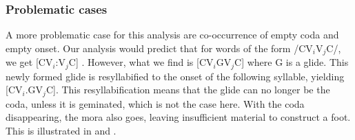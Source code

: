 
\subsubsection{Problematic cases}\label{sec:phon:Problematiccases}


A more problematic case for this analysis are co-occurrence of empty coda and empty onset. Our analysis would predict that for words of the form /CV$_i$V$_j$C/, we get [CV$_i$:V$_j$C] . However, what we find is [CV$_i$GV$_j$C] where G is a glide. This newly formed glide is  resyllabified to the onset of the following syllable, yielding [CV$_i$.GV$_j$C]. This resyllabification means that the glide can no longer be the coda, unless it is geminated, which is not the case here. With the coda disappearing, the mora also goes, leaving insufficient material to construct a foot. This is illustrated in  and .


